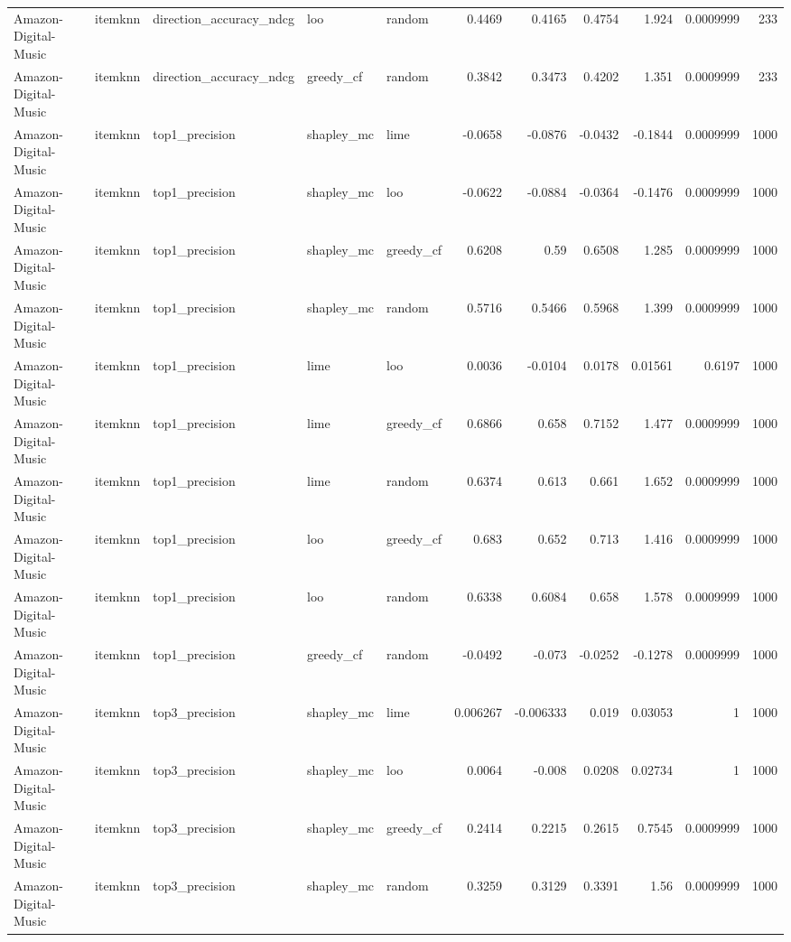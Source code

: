 \begin{table}[t]
\begin{tabular}{lllllrrrrrr}
Amazon-Digital-Music & itemknn & direction\_accuracy\_ndcg & loo & random & 0.4469 & 0.4165 & 0.4754 & 1.924 & 0.0009999 & 233 \\
Amazon-Digital-Music & itemknn & direction\_accuracy\_ndcg & greedy\_cf & random & 0.3842 & 0.3473 & 0.4202 & 1.351 & 0.0009999 & 233 \\
Amazon-Digital-Music & itemknn & top1\_precision & shapley\_mc & lime & -0.0658 & -0.0876 & -0.0432 & -0.1844 & 0.0009999 & 1000 \\
Amazon-Digital-Music & itemknn & top1\_precision & shapley\_mc & loo & -0.0622 & -0.0884 & -0.0364 & -0.1476 & 0.0009999 & 1000 \\
Amazon-Digital-Music & itemknn & top1\_precision & shapley\_mc & greedy\_cf & 0.6208 & 0.59 & 0.6508 & 1.285 & 0.0009999 & 1000 \\
Amazon-Digital-Music & itemknn & top1\_precision & shapley\_mc & random & 0.5716 & 0.5466 & 0.5968 & 1.399 & 0.0009999 & 1000 \\
Amazon-Digital-Music & itemknn & top1\_precision & lime & loo & 0.0036 & -0.0104 & 0.0178 & 0.01561 & 0.6197 & 1000 \\
Amazon-Digital-Music & itemknn & top1\_precision & lime & greedy\_cf & 0.6866 & 0.658 & 0.7152 & 1.477 & 0.0009999 & 1000 \\
Amazon-Digital-Music & itemknn & top1\_precision & lime & random & 0.6374 & 0.613 & 0.661 & 1.652 & 0.0009999 & 1000 \\
Amazon-Digital-Music & itemknn & top1\_precision & loo & greedy\_cf & 0.683 & 0.652 & 0.713 & 1.416 & 0.0009999 & 1000 \\
Amazon-Digital-Music & itemknn & top1\_precision & loo & random & 0.6338 & 0.6084 & 0.658 & 1.578 & 0.0009999 & 1000 \\
Amazon-Digital-Music & itemknn & top1\_precision & greedy\_cf & random & -0.0492 & -0.073 & -0.0252 & -0.1278 & 0.0009999 & 1000 \\
Amazon-Digital-Music & itemknn & top3\_precision & shapley\_mc & lime & 0.006267 & -0.006333 & 0.019 & 0.03053 & 1 & 1000 \\
Amazon-Digital-Music & itemknn & top3\_precision & shapley\_mc & loo & 0.0064 & -0.008 & 0.0208 & 0.02734 & 1 & 1000 \\
Amazon-Digital-Music & itemknn & top3\_precision & shapley\_mc & greedy\_cf & 0.2414 & 0.2215 & 0.2615 & 0.7545 & 0.0009999 & 1000 \\
Amazon-Digital-Music & itemknn & top3\_precision & shapley\_mc & random & 0.3259 & 0.3129 & 0.3391 & 1.56 & 0.0009999 & 1000 \\

\end{tabular}
\end{table}
